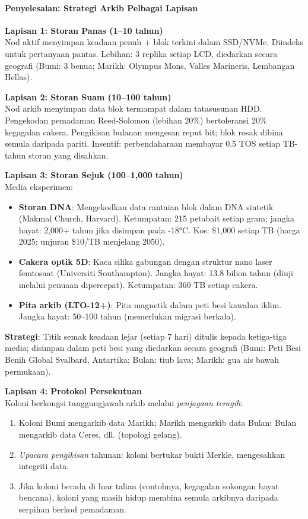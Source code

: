 \documentclass[11pt]{article}
\begin{document}
\paragraph{Penyelesaian: Strategi Arkib Pelbagai Lapisan}

\textbf{Lapisan 1: Storan Panas (1--10 tahun)}\\
Nod aktif menyimpan keadaan penuh + blok terkini dalam SSD/NVMe. Diindeks untuk pertanyaan pantas. Lebihan: 3 replika setiap LCD, diedarkan secara geografi (Bumi: 3 benua; Marikh: Olympus Mons, Valles Marineris, Lembangan Hellas).

\textbf{Lapisan 2: Storan Suam (10--100 tahun)}\\
Nod arkib menyimpan data blok termampat dalam tatasusunan HDD. Pengekodan pemadaman Reed-Solomon (lebihan 20\%) bertoleransi 20\% kegagalan cakera. Pengikisan bulanan mengesan reput bit; blok rosak dibina semula daripada pariti. Insentif: perbendaharaan membayar 0.5 TOS setiap TB-tahun storan yang disahkan.

\textbf{Lapisan 3: Storan Sejuk (100--1,000 tahun)}\\
Media eksperimen:
\begin{itemize}[noitemsep]
  \item \textbf{Storan DNA}: Mengekodkan data rantaian blok dalam DNA sintetik (Makmal Church, Harvard). Ketumpatan: 215 petabait setiap gram; jangka hayat: 2,000+ tahun jika disimpan pada -18°C. Kos: \$1,000 setiap TB (harga 2025; unjuran \$10/TB menjelang 2050).
  \item \textbf{Cakera optik 5D}: Kaca silika gabungan dengan struktur nano laser femtosaat (Universiti Southampton). Jangka hayat: 13.8 bilion tahun (diuji melalui penuaan dipercepat). Ketumpatan: 360 TB setiap cakera.
  \item \textbf{Pita arkib (LTO-12+)}: Pita magnetik dalam peti besi kawalan iklim. Jangka hayat: 50--100 tahun (memerlukan migrasi berkala).
\end{itemize}
\textbf{Strategi}: Titik semak keadaan lejar (setiap 7 hari) ditulis kepada ketiga-tiga media; disimpan dalam peti besi yang diedarkan secara geografi (Bumi: Peti Besi Benih Global Svalbard, Antartika; Bulan: tiub lava; Marikh: gua ais bawah permukaan).

\textbf{Lapisan 4: Protokol Persekutuan}\\
Koloni berkongsi tanggungjawab arkib melalui \emph{penjagaan teragih}:
\begin{enumerate}[noitemsep]
  \item Koloni Bumi mengarkib data Marikh; Marikh mengarkib data Bulan; Bulan mengarkib data Ceres, dll. (topologi gelang).
  \item \emph{Upacara pengikisan} tahunan: koloni bertukar bukti Merkle, mengesahkan integriti data.
  \item Jika koloni berada di luar talian (contohnya, kegagalan sokongan hayat bencana), koloni yang masih hidup membina semula arkibnya daripada serpihan berkod pemadaman.
\end{enumerate}
\end{document}
